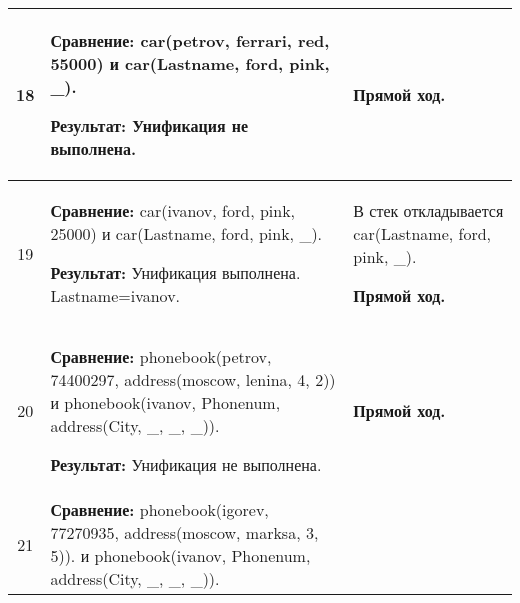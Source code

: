 \begin{longtable}{|c|p{}|p{}|}
    18
                       &
\textbf{Сравнение:} \newline
    car(petrov, ferrari, red,    55000)
    \newline и \newline
    car(Lastname, ford, pink, \_).
    \newline

    \textbf{Результат:} \newline
    Унификация не выполнена.
                       &
    \textbf{Прямой ход.}
                       \\ \hline

    19
                       &
\textbf{Сравнение:} \newline
    car(ivanov, ford,    pink,   25000)
    \newline и \newline
    car(Lastname, ford, pink, \_).
    \newline

    \textbf{Результат:} \newline
    Унификация выполнена.\newline{}
    Lastname=ivanov.
                       &
    В стек откладывается\newline
    car(Lastname, ford, pink, \_).
    \newline

    \textbf{Прямой ход.}
                       \\ \hline

    20
                       &
\textbf{Сравнение:} \newline
    phonebook(petrov, 74400297, address(moscow,    lenina,       4,  2))
    \newline и \newline
    phonebook(ivanov, Phonenum, address(City, \_, \_, \_)).
    \newline

    \textbf{Результат:} \newline
    Унификация не выполнена.
                       &
    \textbf{Прямой ход.}
                       \\ \hline

    21
                       &
\textbf{Сравнение:} \newline
  phonebook(igorev, 77270935,
            address(moscow,    marksa,       3,  5)).
    \newline и \newline
    phonebook(ivanov, Phonenum, address(City, \_, \_, \_)).
    \newline


\end{longtable}
